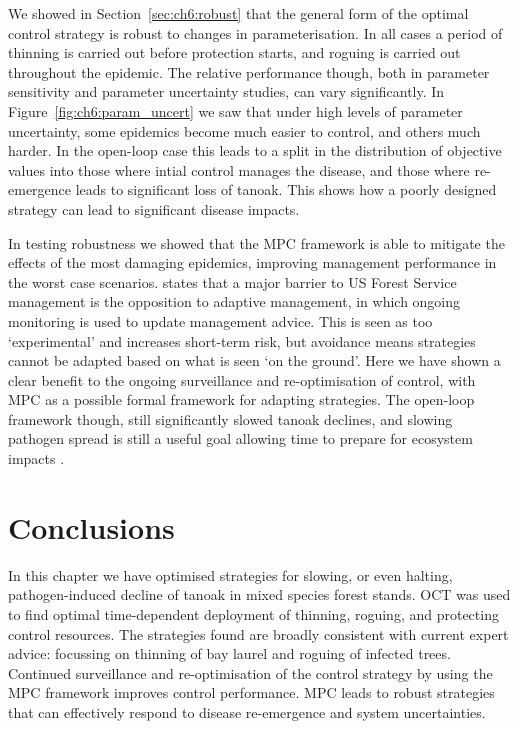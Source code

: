 We showed in Section~\ref{sec:ch6:robust} that the general form of the optimal control strategy is robust to changes in parameterisation. In all cases a period of thinning is carried out before protection starts, and roguing is carried out throughout the epidemic. The relative performance though, both in parameter sensitivity and parameter uncertainty studies, can vary significantly. In Figure~\ref{fig:ch6:param_uncert} we saw that under high levels of parameter uncertainty, some epidemics become much easier to control, and others much harder. In the open-loop case this leads to a split in the distribution of objective values into those where intial control manages the disease, and those where re-emergence leads to significant loss of tanoak. This shows how a poorly designed strategy can lead to significant disease impacts.

In testing robustness we showed that the MPC framework is able to mitigate the effects of the most damaging epidemics, improving management performance in the worst case scenarios. \citet{maccleery_reinventing_2015} states that a major barrier to US Forest Service management is the opposition to adaptive management, in which ongoing monitoring is used to update management advice. This is seen as too `experimental' and increases short-term risk, but avoidance means strategies cannot be adapted based on what is seen `on the ground'. Here we have shown a clear benefit to the ongoing surveillance and re-optimisation of control, with MPC as a possible formal framework for adapting strategies. The open-loop framework though, still significantly slowed tanoak declines, and slowing pathogen spread is still a useful goal allowing time to prepare for ecosystem impacts \citep{cobb_biodiversity_2013}.

\section{Conclusions\label{sec:ch6:conclusions}}

In this chapter we have optimised strategies for slowing, or even halting, pathogen-induced decline of tanoak in mixed species forest stands. OCT was used to find optimal time-dependent deployment of thinning, roguing, and protecting control resources. The strategies found are broadly consistent with current expert advice: focussing on thinning of bay laurel and roguing of infected trees. Continued surveillance and re-optimisation of the control strategy by using the MPC framework improves control performance. MPC leads to robust strategies that can effectively respond to disease re-emergence and system uncertainties.
